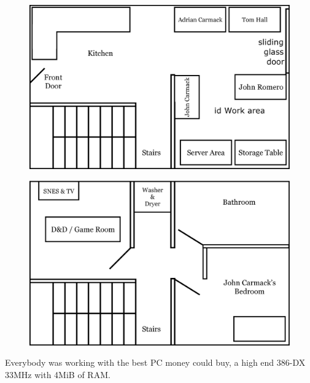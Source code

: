 \documentclass[book.tex]{subfiles}
\begin{document}
\par
\begin{figure}[H]
  \centering
  \includegraphics[width=\textwidth]{imgs/drawings/map/id-software-office-madison_bottom_floor.eps}
\end{figure}
\par
\begin{figure}[H]
  \centering
  \includegraphics[width=\textwidth]{imgs/drawings/map/id-software-office-madison_top_floor.eps}
\end{figure}

\pagebreak
Everybody was working with the best PC money could buy, a high end 386-DX 33MHz with 4MiB of RAM.\\

 
\end{document}
